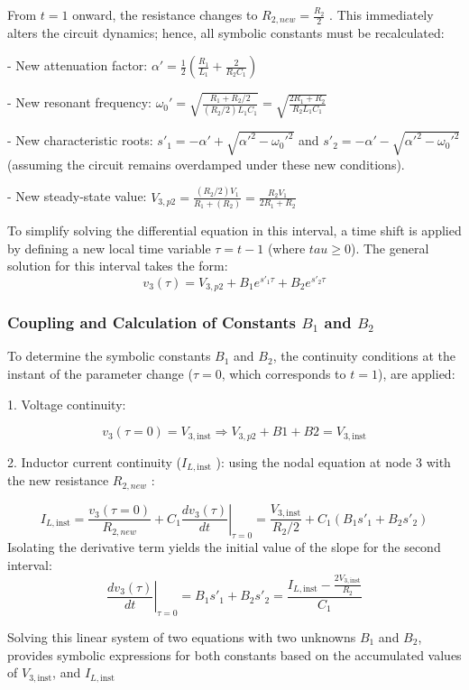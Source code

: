 \documentclass[11pt, a4paper]{article}
\begin{document}
From $t = 1$ onward, the resistance changes to $R_{2,new} = \frac{R_2}{2}$ . This immediately alters the circuit dynamics; hence, all symbolic constants must be recalculated:

- New attenuation factor:
$\alpha'= \frac{1}{2}\left(\frac{R_1}{L_1}+\frac{2}{R_2C_1}\right)$

- New resonant frequency:
$\omega_0' = \sqrt{\frac{R_1+R_2/2}{(R_2/2)L_1C_1}}
 = \sqrt{\frac{2 R_1+R_2}{R_2L_1C_1}}$

- New characteristic roots:
$s'_1 = -\alpha' + \sqrt{\alpha'^2 - \omega_0'^2}$ and
$s'_2 = -\alpha' - \sqrt{\alpha'^2 - \omega_0'^2}$
(assuming the circuit remains overdamped under these new conditions).

- New steady-state value:
$V_{3,p2} = \frac{(R_2/2) V_1}{R_1+(R_2)}
= \frac{R_2 V_1}{2R_1+R_2}$

To simplify solving the differential equation in this interval, a time shift is applied by defining a new local time variable
$\tau = t - 1$ (where $tau \ge $0).
The general solution for this interval takes the form:
\[
v_3(\tau ) = V_{3,p2} + B_1 e^{s'_1\tau} + B_2 e^{s'_2\tau}
\]

\subsubsection*{Coupling and Calculation of Constants $B_1$ and $B_2$}

\medskip

To determine the symbolic constants $B_1$ and $B_2$, the continuity conditions at the instant of the parameter change ($\tau = 0$, which corresponds to $t = 1$), are applied:

1. Voltage continuity:

\[
v_3(\tau=0) = V_{3,\mathrm{inst}} \Rightarrow
V_{3,p2} + B1 + B2 = V_{3,\mathrm{inst}}
\]

2. Inductor current continuity ($I_{L,\mathrm{inst}}$ ): using the nodal equation at node 3 with the new resistance $R_{2,new}$ :

\[
I_{L,\mathrm{inst}} = \frac{v_3(\tau=0)}{R_{2,new}}
+ C_1\left.\frac{d v_3(\tau)}{dt}\right|_{\tau=0} =
\frac{V_{3,\mathrm{inst}}}{R_2/2} + C_1 (B_1 s'_1 + B_2 s'_2)
\]
Isolating the derivative term yields the initial value of the slope for the second interval:
\[
\left.\frac{d v_3(\tau)}{dt}\right|_{\tau=0}= B_1 s'_1 + B_2 s'_2
= \frac{I_{L,\mathrm{inst}}-\frac{2V_{3,\mathrm{inst}}}{R_2}}{C_1}
\]

Solving this linear system of two equations with two unknowns
$B_1$ and $B_2$, provides symbolic expressions for both constants based on the accumulated values of $V_{3,\mathrm{inst}}$, and $I_{L,\mathrm{inst}}$
\end{document}
